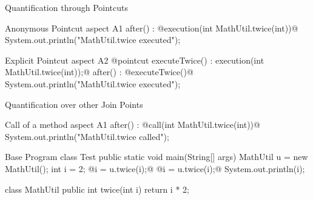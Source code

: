 \begin{frame}[fragile]{Quantification through Pointcuts}
	\begin{mycolumns}[widths={50,50},animation=none]
	\mynextcolumn
{\small
\begin{codetight}{Anonymous Pointcut}
aspect A1 {
	after() : @execution(int MathUtil.twice(int))@ {
		System.out.println("MathUtil.twice executed");
	}
}
\end{codetight}			
\begin{codetight}{Explicit Pointcut}
aspect A2 {
	@pointcut executeTwice() : 
			execution(int MathUtil.twice(int));@
	after() : @executeTwice()@ {
		System.out.println("MathUtil.twice executed");
	}
}
\end{codetight}	
}
	\end{mycolumns}
\end{frame}

\begin{frame}[fragile]{Quantification over other Join Points}
	\begin{mycolumns}[widths={50,50},animation=none]
\begin{codetight}{Call of a method}
aspect A1 {
	after() : @call(int MathUtil.twice(int))@ {
		System.out.println("MathUtil.twice called");
	}
}
\end{codetight}
	\mynextcolumn
\begin{codetight}{Base Program}
class Test {
	public static void main(String[] args) {
		MathUtil u = new MathUtil();
		int i = 2;
		@i = u.twice(i);@
		@i = u.twice(i);@
		System.out.println(i);
	}
}

class MathUtil {
	public int twice(int i) {
		return i * 2;
	}
}
\end{codetight}	
	\end{mycolumns}
\end{frame}

